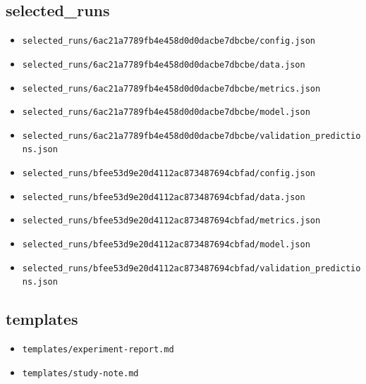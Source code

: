 \subsection{selected\_runs}
\begin{itemize}
\item \nolinkurl{selected_runs/6ac21a7789fb4e458d0d0dacbe7dbcbe/config.json}
\item \nolinkurl{selected_runs/6ac21a7789fb4e458d0d0dacbe7dbcbe/data.json}
\item \nolinkurl{selected_runs/6ac21a7789fb4e458d0d0dacbe7dbcbe/metrics.json}
\item \nolinkurl{selected_runs/6ac21a7789fb4e458d0d0dacbe7dbcbe/model.json}
\item \nolinkurl{selected_runs/6ac21a7789fb4e458d0d0dacbe7dbcbe/validation_predictions.json}
\item \nolinkurl{selected_runs/bfee53d9e20d4112ac873487694cbfad/config.json}
\item \nolinkurl{selected_runs/bfee53d9e20d4112ac873487694cbfad/data.json}
\item \nolinkurl{selected_runs/bfee53d9e20d4112ac873487694cbfad/metrics.json}
\item \nolinkurl{selected_runs/bfee53d9e20d4112ac873487694cbfad/model.json}
\item \nolinkurl{selected_runs/bfee53d9e20d4112ac873487694cbfad/validation_predictions.json}
\end{itemize}

\subsection{templates}
\begin{itemize}
\item \nolinkurl{templates/experiment-report.md}
\item \nolinkurl{templates/study-note.md}
\end{itemize}

